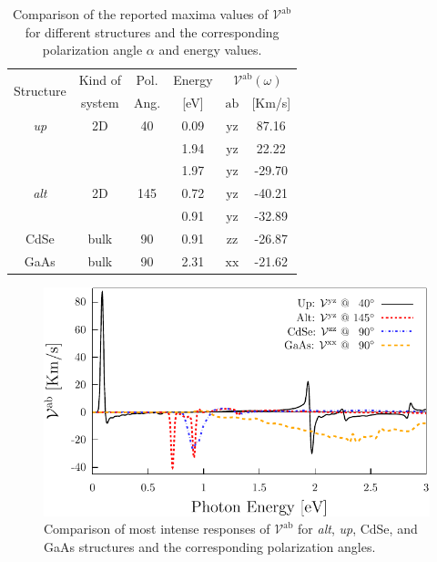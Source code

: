 \documentclass[prb,11pt,tightenlines,twocolumn,aps]{revtex4-1}
\begin{document}
\begin{table}[b]
\begin{tabular}{cccccc}
\hline
\multirow{2}{*}{Structure \quad} & 
Kind of \quad & 
Pol. &
Energy & 
\multicolumn{2}{c}{$\mathcal{V}^{\mathrm{ab}}(\omega)$}\\
\cline{5-6}
& system & Ang. & [eV] & $\mathrm{ab}$ \quad & [Km/s]\\
\hline
\emph{up}    & 2D   & 40    & 0.09  & $\mathrm{yz}$ &  87.16    \\
             &      &       & 1.94  & $\mathrm{yz}$ &  22.22    \\
             &      &       & 1.97  & $\mathrm{yz}$ & -29.70    \\
\emph{alt}   & 2D   & 145   & 0.72  & $\mathrm{yz}$ & -40.21    \\
             &      &       & 0.91  & $\mathrm{yz}$ & -32.89    \\
 CdSe        & bulk & 90    & 0.91  & $\mathrm{zz}$ & -26.87    \\
 GaAs        & bulk & 90    & 2.31  & $\mathrm{xx}$ & -21.62    \\
\hline
\end{tabular}

\caption{Comparison of the reported maxima values of
$\mathcal{V}^{\mathrm{ab}}$ for different structures and the corresponding
polarization angle $\alpha$ and energy values.}
\label{tab:vab-str-comp}
\end{table}

\begin{figure}[t]
    \centering
    \includegraphics[width=\linewidth]{plots/vab-str-comp}
    
    \caption{Comparison of most intense responses of $\mathcal{V}^{\mathrm{ab}}$
    for \emph{alt}, \emph{up}, CdSe, and GaAs structures and the corresponding
    polarization angles.}
    \label{fig:vab-str-comp}
\end{figure}
\end{document}
